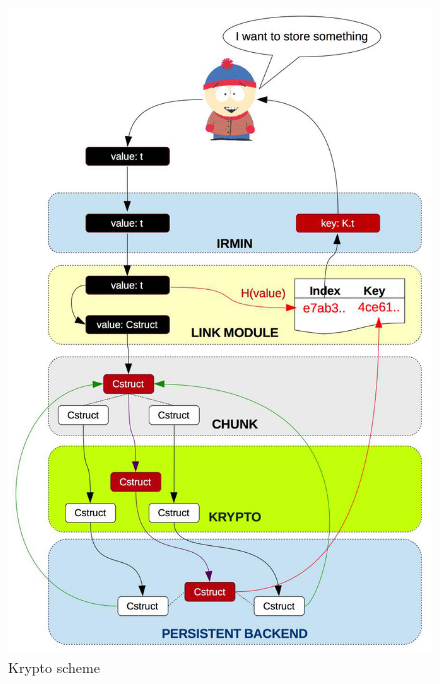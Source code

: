 \documentclass[10pt,a4paper]{report}
\begin{document}
\begin{figure}[H]
\centerline{\includegraphics[scale=0.30]{img/add-krypto-chunck.jpg}}
\caption{Krypto scheme}
\end{figure}
\end{document}
